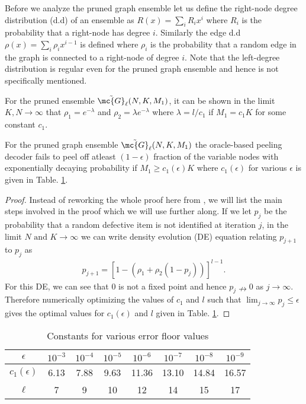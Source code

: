 \documentclass[conference,,twocolumn]{IEEEtran}
\begin{document}
Before we analyze the pruned graph ensemble let us define the right-node degree distribution (d.d) of an ensemble as $R(x)=\sum_{i}R_i x^i$ where $R_i$ is the probability that a right-node has degree $i$. Similarly the edge d.d $\rho(x)=\sum_{i}\rho_ix^{i-1}$ is defined where $\rho_i$ is the probability that a random edge in the graph is connected to a right-node of degree $i$. Note that the left-degree distribution is regular even for the pruned graph ensemble and hence is not specifically mentioned.

\begin{lemma}
For the pruned ensemble $\tilde{\mc{G}}_{\ell}(N,K,M_1)$, it can be shown in the limit $K,N\rightarrow\infty$ that $\rho_{1}=e^{-\lambda}$ and $\rho_{2}=\lambda e^{-\lambda}$ where $\lambda=l/c_1$ if $M_1=c_1K$ for some constant $c_1$. 
\end{lemma}

\begin{lemma}
\label{Lem:PeelingAnalysisLeftRegular}
For the pruned graph ensemble $\tilde{\mc{G}}_{\ell}(N, K,M_1)$ the oracle-based peeling decoder fails to peel off atleast $(1-\epsilon)$ fraction of the variable nodes with exponentially decaying probability if $M_1\geq c_1(\epsilon)K$ where $c_1(\epsilon)$ for various $\epsilon$ is given in Table. \ref{Table:constantsDE}.
\end{lemma}
\begin{proof}
Instead of reworking the whole proof here from \cite{lee2015saffron}, we will list the main steps involved in the proof which we will use further along. If we let $p_j$ be the probability that a random defective item is not identified at iteration $j$, in the limit $N \text{ and } K\rightarrow \infty$ we can write density evolution (DE) equation relating $p_{j+1}$ to $p_{j}$ as 
\begin{align*}
p_{j+1}=\left[1-(\rho_1+\rho_2(1-p_j))\right]^{l-1}.
\end{align*}
For this DE, we can see that $0$ is not a fixed point and hence $p_j\nrightarrow 0$ as $j\rightarrow\infty$. Therefore numerically optimizing the values of $c_1$ and $l$ such that $\lim_{j\rightarrow\infty}p_j\leq \epsilon$ gives the optimal values for $c_1(\epsilon)$ and $l$ given in Table. \ref{Table:constantsDE}.
\end{proof}

\begin{table}[t]
\centering
\begin{tabular}{| c | c | c | c | c | c | c | c | }
\hline
$\epsilon$ & $10^{-3}$ & $10^{-4}$ & $10^{-5}$ & $10^{-6}$ &$ 10^{-7}$ & $10^{-8}$ & $10^{-9}$ \\ \hline
$c_1(\epsilon)$ & 6.13 & 7.88 & 9.63 & 11.36 & 13.10 & 14.84 & 16.57 \\ \hline
 $\ell$ & 7 & 9 & 10 & 12 & 14 & 15 & 17 \\ \hline
\end{tabular}
\vspace{1ex}
\caption{Constants for various error floor values}
\label{Table:constantsDE}
\end{table}
\end{document}
